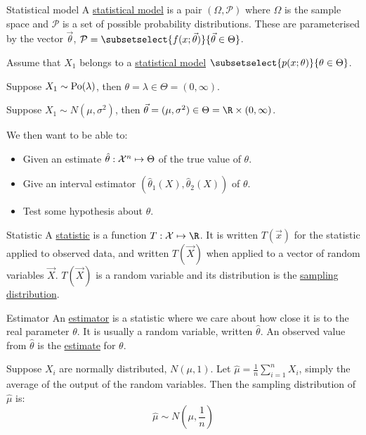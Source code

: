 \documentclass[../Main.tex]{subfiles}
\begin{document}
\begin{definition}{Statistical model}
    A \underline{statistical model} is a pair $(\Omega, \mathcal{P})$ where $\Omega$ is the sample space and $\mathcal{P}$ is a set of possible probability distributions. These are parameterised by the vector $\vec{\theta}$, $\mathcal{P} = \subsetselect{f(x;\vec{\theta})}{\vec{\theta} \in \Theta}$.
\end{definition}

Assume that $X_1$ belongs to a \underline{statistical model} $\subsetselect{p(x;\theta)}{\theta \in \Theta}$.
\begin{examples}{}
    \item Suppose $X_1 \sim \operatorname{Po}(\lambda)$, then $\theta = \lambda \in \Theta = (0, \infty)$.
    \item Suppose $X_1 \sim N(\mu, \sigma^2)$, then $\vec{\theta} = (\mu, \sigma^2) \in \Theta = \R \times (0, \infty)$.
\end{examples}
We then want to be able to:
\begin{itemize}
    \item Given an estimate $\hat{\theta} : \mathcal{X}^n \mapsto \Theta$ of the true value of $\theta$.
    \item Give an interval estimator $(\hat{\theta}_1(X), \hat{\theta}_2(X))$ of $\theta$.
    \item Test some hypothesis about $\theta$.
\end{itemize}
\begin{definition}{Statistic}
    A \underline{statistic} is a function $T : \samplespace \mapsto \R$. It is written $T(\vec{x})$ for the statistic applied to observed data, and written $T(\vec{X})$ when applied to a vector of random variables $\vec{X}$. $T(\vec{X})$ is a random variable and its distribution is the \underline{sampling distribution}.
\end{definition}
\begin{definition}{Estimator}
    An \underline{estimator} is a statistic where we care about how close it is to the real parameter $\theta$. It is usually a random variable, written $\hat{\theta}$. An observed value from $\hat{\theta}$ is the \underline{estimate} for $\theta$.
\end{definition}
\begin{example}
    Suppose $X_i$ are normally distributed, $N(\mu, 1)$. Let $\hat{\mu} = \frac1n \sum_{i=1}^n X_i$, simply the average of the output of the random variables. Then the sampling distribution of $\hat{\mu}$ is:
    \begin{equation*}
        \hat{\mu} \sim N\left(\mu, \frac1n\right)
    \end{equation*}
    \label{expNormalEstimator}
\end{example}
\end{document}
